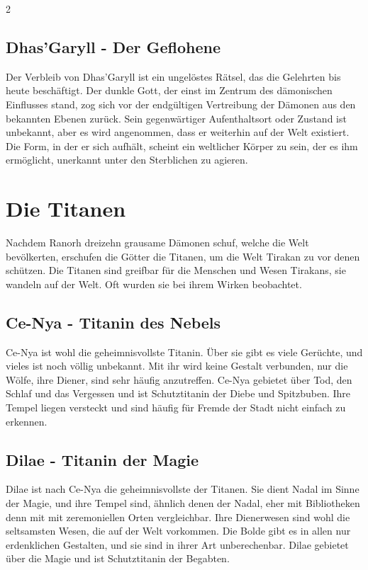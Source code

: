\begin{multicols*}{2}
\subsection{Dhas'Garyll - Der Geflohene}\label{subsec:dhasgaryll-der-geflohene}

Der Verbleib von Dhas'Garyll ist ein ungelöstes Rätsel, das die Gelehrten bis heute beschäftigt.
Der dunkle Gott, der einst im Zentrum des dämonischen Einflusses stand, zog sich vor der endgültigen Vertreibung der Dämonen aus den bekannten Ebenen zurück.
Sein gegenwärtiger Aufenthaltsort oder Zustand ist unbekannt, aber es wird angenommen, dass er weiterhin auf der Welt existiert.
Die Form, in der er sich aufhält, scheint ein weltlicher Körper zu sein, der es ihm ermöglicht, unerkannt unter den Sterblichen zu agieren.


\section{Die Titanen}\label{sec:die-titanen}

Nachdem Ranorh dreizehn grausame Dämonen schuf, welche die Welt bevölkerten, erschufen die Götter die Titanen, um die Welt Tirakan zu vor denen schützen.
Die Titanen sind greifbar für die Menschen und Wesen Tirakans, sie wandeln auf der Welt.
Oft wurden sie bei ihrem Wirken beobachtet.

\subsection{Ce-Nya - Titanin des Nebels}\label{subsec:ce-nya-titanin-des-nebels}

Ce-Nya ist wohl die geheimnisvollste Titanin.
Über sie gibt es viele Gerüchte, und vieles ist noch völlig unbekannt.
Mit ihr wird keine Gestalt verbunden, nur die Wölfe, ihre Diener, sind sehr häufig anzutreffen.
Ce-Nya gebietet über Tod, den Schlaf und das Vergessen und ist Schutztitanin der Diebe und Spitzbuben.
Ihre Tempel liegen versteckt und sind häufig für Fremde der Stadt nicht einfach zu erkennen.

\subsection{Dilae - Titanin der Magie}\label{subsec:dilae-titanin-der-magie}

Dilae ist nach Ce-Nya die geheimnisvollste der Titanen.
Sie dient Nadal im Sinne der Magie, und ihre Tempel sind, ähnlich denen der Nadal, eher mit Bibliotheken denn mit mit zeremoniellen Orten vergleichbar.
Ihre Dienerwesen sind wohl die seltsamsten Wesen, die auf der Welt vorkommen.
Die Bolde gibt es in allen nur erdenklichen Gestalten, und sie sind in ihrer Art unberechenbar.
Dilae gebietet über die Magie und ist Schutztitanin der Begabten.


\end{multicols*}

